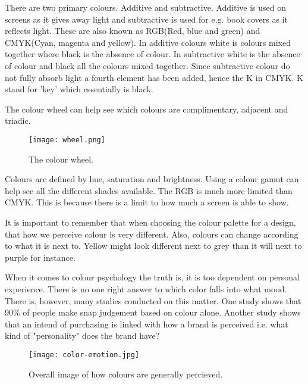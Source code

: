 There are two primary colours. Additive and subtractive. Additive is used on screens as it gives away light and subtractive is used for e.g. book covers as it reflects light. \cite{Colour}
These are also known as RGB(Red, blue and green) and CMYK(Cyan, magenta and yellow).
In additive colours white is colours mixed together where black is the absence of colour. In subtractive white is the absence of colour and black all the colours mixed together. 
Since subtractive colour do not fully absorb light a fourth element has been added, hence the K in CMYK. K stand for 'key' which essentially is black.\cite{Colour}

The colour wheel can help see which colours are complimentary, adjacent and triadic. 
\begin{figure}[H]
\centering
\texttt{[image: wheel.png]}
\caption{The colour wheel. \cite{Colour}}
\end{figure}

Colours are defined by hue, saturation and brightness. 
Using a colour gamut can help see all the different shades available. The RGB is much more limited than CMYK. This is because there is a limit to how much a screen is able to show. 

It is important to remember that when choosing the colour palette for a design, that how we perceive colour is very different. Also, colours can change according to what it is next to. Yellow might look different next to grey than it will next to purple for instance. \cite{Colour}

When it comes to colour psychology the truth is, it is too dependent on personal experience. There is no one right answer to which color falls into what mood. \cite{ColorMeaning}
There is, however, many studies conducted on this matter. 
One study shows that 90\% of people make snap judgement based on colour alone. \cite{ColorMeaning} Another study shows that an intend of purchasing is linked with how a brand is perceived i.e. what kind of "personality" does the brand have?\cite{ColorMeaning}

\begin{figure}[H]
\centering
\texttt{[image: color-emotion.jpg]}
\caption{Overall image of how colours are generally percieved. \cite{ColorMeaning}}
\end{figure}

